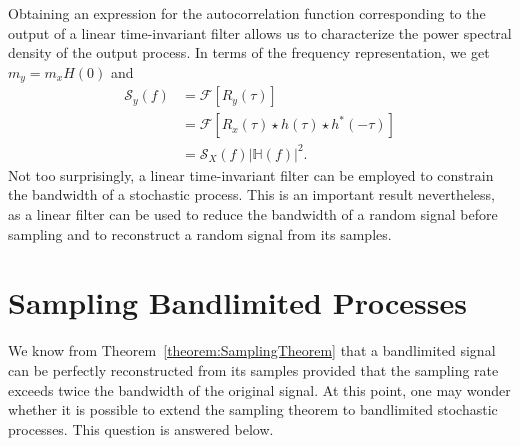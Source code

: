 Obtaining an expression for the autocorrelation function corresponding to the output of a linear time-invariant filter allows us to characterize the power spectral density of the output process.
In terms of the frequency representation, we get $m_y = m_x H(0)$ and
\begin{equation*}
\begin{split}
\mathcal{S}_y (f) &= \mathcal{F} [ R_y (\tau) ] \\
&= \mathcal{F} \left[ R_x (\tau) \star h(\tau) \star h^*(-\tau) \right] \\
&= \mathcal{S}_X(f) |\mathbb{H}(f)|^2 .
\end{split}
\end{equation*}
Not too surprisingly, a linear time-invariant filter can be employed to constrain the bandwidth of a stochastic process.
This is an important result nevertheless, as a linear filter can be used to reduce the bandwidth of a random signal before sampling and to reconstruct a random signal from its samples.


\section{Sampling Bandlimited Processes}

We know from Theorem~\ref{theorem:SamplingTheorem} that a bandlimited signal can be perfectly reconstructed from its samples provided that the sampling rate exceeds twice the bandwidth of the original signal.
At this point, one may wonder whether it is possible to extend the sampling theorem to bandlimited stochastic processes.
This question is answered below.

